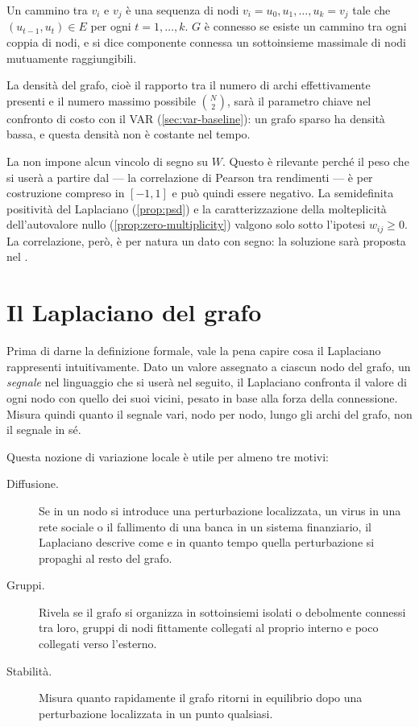 Un cammino tra $v_i$ e $v_j$ è una sequenza di nodi $v_i = u_0, u_1, \dots, u_k = v_j$ tale che $(u_{t-1}, u_t) \in E$ per ogni $t = 1, \dots, k$. $G$ è connesso se esiste un cammino tra ogni coppia di nodi, e si dice componente connessa un sottoinsieme massimale di nodi mutuamente raggiungibili.

La densità del grafo, cioè il rapporto tra il numero di archi effettivamente presenti e il numero massimo possibile $\binom{N}{2}$, sarà il parametro chiave nel confronto di costo con il VAR (\cref{sec:var-baseline}): un grafo sparso ha densità bassa, e questa densità non è costante nel tempo.

\begin{remark}
\label{rem:negative-weights}
La  non impone alcun vincolo di segno su $W$. Questo è rilevante perché il peso che si userà a partire dal  — la correlazione di Pearson tra rendimenti — è per costruzione compreso in $[-1,1]$ e può quindi essere negativo. La semidefinita positività del Laplaciano (\cref{prop:psd}) e la caratterizzazione della molteplicità dell'autovalore nullo (\cref{prop:zero-multiplicity}) valgono solo sotto l'ipotesi $w_{ij}\geq 0$. La correlazione, però, è per natura un dato con segno: la soluzione sarà proposta nel .
\end{remark}

\section{Il Laplaciano del grafo}
\label{sec:graph-laplacian}

Prima di darne la definizione formale, vale la pena capire cosa il Laplaciano rappresenti intuitivamente. Dato un valore assegnato a ciascun nodo del grafo, un \emph{segnale} nel linguaggio che si userà nel seguito, il Laplaciano confronta il valore di ogni nodo con quello dei suoi vicini, pesato in base alla forza della connessione. Misura quindi quanto il segnale vari, nodo per nodo, lungo gli archi del grafo, non il segnale in sé.

Questa nozione di variazione locale è utile per almeno tre motivi:

\begin{description}
    \item[Diffusione.] Se in un nodo si introduce una perturbazione localizzata, un virus in una rete sociale o il fallimento di una banca in un sistema finanziario, il Laplaciano descrive come e in quanto tempo quella perturbazione si propaghi al resto del grafo.
    \item[Gruppi.] Rivela se il grafo si organizza in sottoinsiemi isolati o debolmente connessi tra loro, gruppi di nodi fittamente collegati al proprio interno e poco collegati verso l'esterno.
    \item[Stabilità.] Misura quanto rapidamente il grafo ritorni in equilibrio dopo una perturbazione localizzata in un punto qualsiasi.
\end{description}

